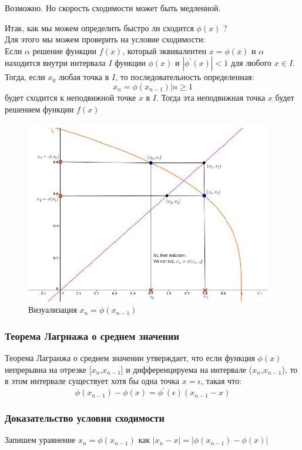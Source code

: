 \documentclass[11pt, english]{article}
\begin{document}
Возможно. Но скорость сходимости может быть медленной.

Итак, как мы можем определить быстро ли сходится $\phi(x)$ ?
\\

Для этого мы можем проверить на условие сходимости:
\\

Если $\alpha$ решение функции $f(x)$, который эквивалентен $x = \phi(x)$ и $\alpha$ находится внутри интервала $I$ функции $\phi(x)$ и $|\phi^{'}(x)| < 1$ для любого $x \in I$. Тогда, если $x_0$ любая точка в $I$, то последовательность определенная:
$$x_n = \phi(x_{n-1}) | n \geq 1$$
будет сходится к неподвижной точке $x$ в $I$. Тогда эта неподвижная точка $x$ будет решением функции $f(x)$

\begin{figure}[h!]
    \centering
    \includegraphics[height=8cm]{visualization_phi_x.png}
    \caption{Визуализация $x_n = \phi(x_{n-1})$}
    \label{fig:my_label}
\end{figure}

\subsubsection{Теорема Лагрнажа о среднем значении}
Теорема Лагранжа о среднем значении утверждает, что если функция $\phi(x)$ непрерывна на отрезке [$x_n$,$x_{n-1}$] и дифференцируема на интервале ($x_n$,$x_{n-1}$), то в этом интервале существует хотя бы одна точка $x = \epsilon$, такая что:
$$\phi(x_{n-1}) - \phi(x) = \phi^{'}(\epsilon)(x_{n-1} - x)$$

\subsubsection{Доказательство условия сходимости}
Запишем уравнение $x_n = \phi(x_{n-1})$ как $|x_n - x | = |\phi(x_{n-1}) - \phi(x)|$\\
\end{document}
